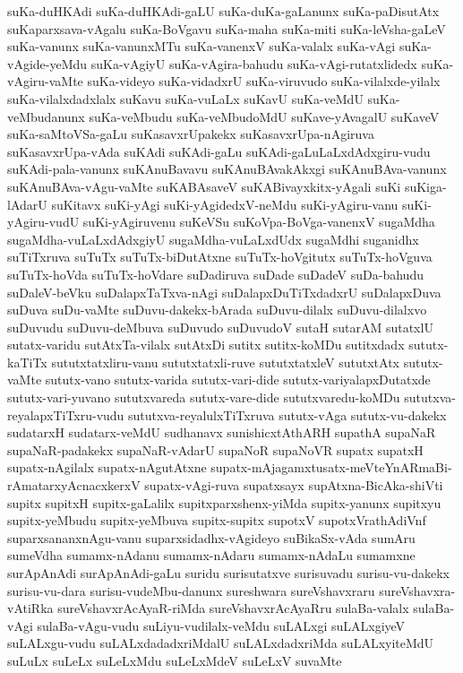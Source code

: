 {suKa-duHKAdi
suKa-duHKAdi-gaLU
suKa-duKa-gaLanunx
suKa-paDisutAtx
suKaparxsava-vAgalu
suKa-BoVgavu
suKa-maha
suKa-miti
suKa-leVsha-gaLeV
suKa-vanunx
suKa-vanunxMTu
suKa-vanenxV
suKa-valalx
suKa-vAgi
suKa-vAgide-yeMdu
suKa-vAgiyU
suKa-vAgira-bahudu
suKa-vAgi-rutatxlidedx
suKa-vAgiru-vaMte
suKa-videyo
suKa-vidadxrU
suKa-viruvudo
suKa-vilalxde-yilalx
suKa-vilalxdadxlalx
suKavu
suKa-vuLaLx
suKavU
suKa-veMdU
suKa-veMbudanunx
suKa-veMbudu
suKa-veMbudoMdU
suKave-yAvagalU
suKaveV
suKa-saMtoVSa-gaLu
suKasavxrUpakekx
suKasavxrUpa-nAgiruva
suKasavxrUpa-vAda
suKAdi
suKAdi-gaLu
suKAdi-gaLuLaLxdAdxgiru-vudu
suKAdi-pala-vanunx
suKAnuBavavu
suKAnuBAvakAkxgi
suKAnuBAva-vanunx
suKAnuBAva-vAgu-vaMte
suKABAsaveV
suKABivayxkitx-yAgali
suKi
suKiga-lAdarU
suKitavx
suKi-yAgi
suKi-yAgidedxV-neMdu
suKi-yAgiru-vanu
suKi-yAgiru-vudU
suKi-yAgiruvenu
suKeVSu
suKoVpa-BoVga-vanenxV
sugaMdha
sugaMdha-vuLaLxdAdxgiyU
sugaMdha-vuLaLxdUdx
sugaMdhi
suganidhx
suTiTxruva
suTuTx
suTuTx-biDutAtxne
suTuTx-hoVgitutx
suTuTx-hoVguva
suTuTx-hoVda
suTuTx-hoVdare
suDadiruva
suDade
suDadeV
suDa-bahudu
suDaleV-beVku
suDalapxTaTxva-nAgi
suDalapxDuTiTxdadxrU
suDalapxDuva
suDuva
suDu-vaMte
suDuvu-dakekx-bArada
suDuvu-dilalx
suDuvu-dilalxvo
suDuvudu
suDuvu-deMbuva
suDuvudo
suDuvudoV
sutaH
sutarAM
sutatxlU
sutatx-varidu
sutAtxTa-vilalx
sutAtxDi
sutitx
sutitx-koMDu
sutitxdadx
sututx-kaTiTx
sututxtatxliru-vanu
sututxtatxli-ruve
sututxtatxleV
sututxtAtx
sututx-vaMte
sututx-vano
sututx-varida
sututx-vari-dide
sututx-variyalapxDutatxde
sututx-vari-yuvano
sututxvareda
sututx-vare-dide
sututxvaredu-koMDu
sututxva-reyalapxTiTxru-vudu
sututxva-reyalulxTiTxruva
sututx-vAga
sututx-vu-dakekx
sudatarxH
sudatarx-veMdU
sudhanavx
sunishicxtAthARH
supathA
supaNaR
supaNaR-padakekx
supaNaR-vAdarU
supaNoR
supaNoVR
supatx
supatxH
supatx-nAgilalx
supatx-nAgutAtxne
supatx-mAjagamxtusatx-meVteYnARmaBi-rAmatarxyAcnacxkerxV
supatx-vAgi-ruva
supatxsayx
supAtxna-BicAka-shiVti
supitx
supitxH
supitx-gaLalilx
supitxparxshenx-yiMda
supitx-yanunx
supitxyu
supitx-yeMbudu
supitx-yeMbuva
supitx-supitx
supotxV
supotxVrathAdiVnf
suparxsananxnAgu-vanu
suparxsidadhx-vAgideyo
suBikaSx-vAda
sumAru
sumeVdha
sumamx-nAdanu
sumamx-nAdaru
sumamx-nAdaLu
sumamxne
surApAnAdi
surApAnAdi-gaLu
suridu
surisutatxve
surisuvadu
surisu-vu-dakekx
surisu-vu-dara
surisu-vudeMbu-danunx
sureshwara
sureVshavxraru
sureVshavxra-vAtiRka
sureVshavxrAcAyaR-riMda
sureVshavxrAcAyaRru
sulaBa-valalx
sulaBa-vAgi
sulaBa-vAgu-vudu
suLiyu-vudilalx-veMdu
suLALxgi
suLALxgiyeV
suLALxgu-vudu
suLALxdadadxriMdalU
suLALxdadxriMda
suLALxyiteMdU
suLuLx
suLeLx
suLeLxMdu
suLeLxMdeV
suLeLxV
suvaMte
}

